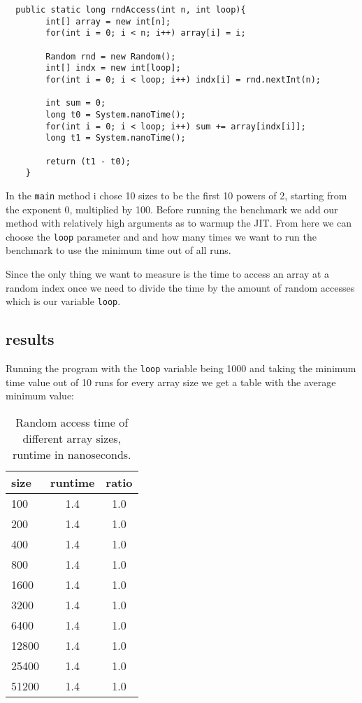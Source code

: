 \documentclass[a4paper,11pt]{article}
\begin{document}
\begin{verbatim}
  public static long rndAccess(int n, int loop){
        int[] array = new int[n];
        for(int i = 0; i < n; i++) array[i] = i;

        Random rnd = new Random();
        int[] indx = new int[loop];
        for(int i = 0; i < loop; i++) indx[i] = rnd.nextInt(n);
        
        int sum = 0;
        long t0 = System.nanoTime();
        for(int i = 0; i < loop; i++) sum += array[indx[i]];
        long t1 = System.nanoTime();

        return (t1 - t0);
    }
\end{verbatim}

In the {\tt main} method i chose 10 sizes to be the first 10 powers
of 2, starting from the exponent 0, multiplied by 100. Before running
the benchmark we add our method with relatively high arguments as to
warmup the JIT. From here we can choose the {\tt loop} parameter and
and how many times we want to run the benchmark to use the minimum time 
out of all runs.

Since the only thing we want to measure is the time to access an array 
at a random index once we need to divide the time by the amount of 
random accesses which is our variable {\tt loop}.

\subsection*{results}

Running the program with the {\tt loop} variable being 1000 and taking
the minimum time value out of 10 runs for every array size we get a
table with the average minimum value:

\begin{table}[h]
\begin{center}
\begin{tabular}{l|c|c}
\textbf{size} & \textbf{runtime} & \textbf{ratio}\\
\hline
  100      & 1.4 &     1.0\\
  200      & 1.4 &     1.0\\
  400      & 1.4 &     1.0\\
  800      & 1.4 &     1.0\\
  1600     & 1.4 &     1.0\\
  3200     & 1.4 &     1.0\\
  6400     & 1.4 &     1.0\\
  12800    & 1.4 &     1.0\\
  25400    & 1.4 &     1.0\\
  51200    & 1.4 &     1.0\\ 
\end{tabular}
\caption{Random access time of different array sizes, runtime in 
        nanoseconds.}
\label{tab:table1}
\end{center}
\end{table}
\end{document}
